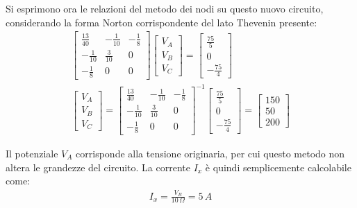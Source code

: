 \documentclass{article}
\numberwithin{equation}{subsection}
\begin{document}
Si esprimono ora le relazioni del metodo dei nodi su questo nuovo circuito, considerando la forma Norton corrispondente del lato Thevenin presente: 
\begin{gather*}
    \begin{bmatrix}
        \displaystyle\frac{13}{40}&-\displaystyle\frac{1}{10}&-\displaystyle\frac{1}{8}\\
        -\displaystyle\frac{1}{10}&\displaystyle\frac{3}{10}&0\\
        -\displaystyle\frac{1}{8}&0&0
    \end{bmatrix}\begin{bmatrix}
        V_A\\V_B\\V_C
    \end{bmatrix}=\begin{bmatrix}
        \displaystyle\frac{75}{5}\\0\\-\displaystyle\frac{75}{4}
    \end{bmatrix}\\
    \begin{bmatrix}
        V_A\\V_B\\V_C
    \end{bmatrix}=\begin{bmatrix}
        \displaystyle\frac{13}{40}&-\displaystyle\frac{1}{10}&-\displaystyle\frac{1}{8}\\
        -\displaystyle\frac{1}{10}&\displaystyle\frac{3}{10}&0\\
        -\displaystyle\frac{1}{8}&0&0
    \end{bmatrix}^{-1}\begin{bmatrix}
        \displaystyle\frac{75}{5}\\0\\-\displaystyle\frac{75}{4}
    \end{bmatrix}=\begin{bmatrix}
        150\\50\\200
    \end{bmatrix}
\end{gather*}

Il potenziale $V_A$ corrisponde alla tensione originaria, per cui questo metodo non altera le grandezze del circuito. La corrente $I_x$ è quindi semplicemente calcolabile come:
\begin{gather*}
    I_x=\displaystyle\frac{V_B}{10\,\Omega}=5\,A
\end{gather*}
\end{document}
